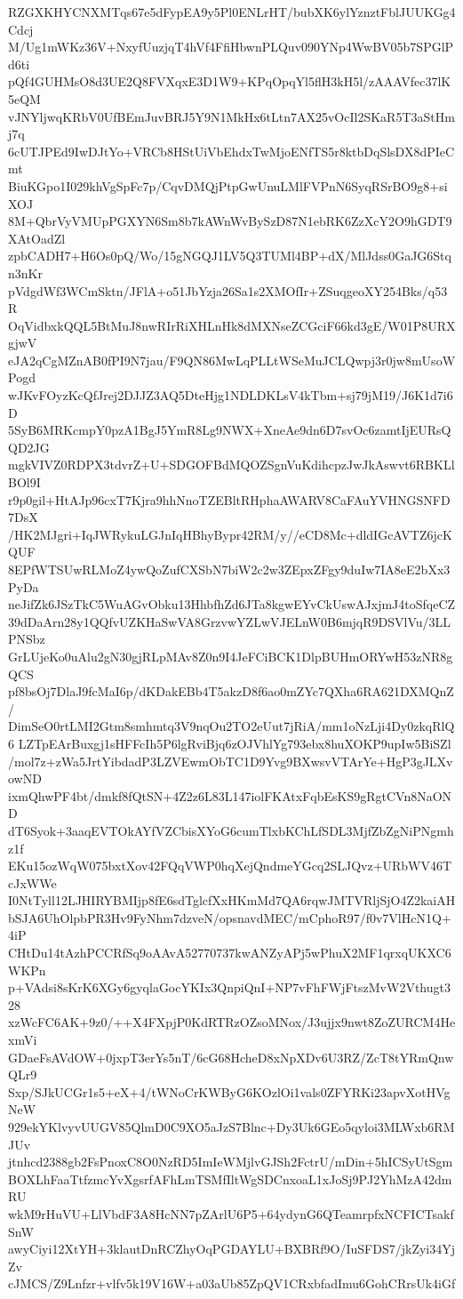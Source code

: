RZGXKHYCNXMTqs67e5dFypEA9y5Pl0ENLrHT/bubXK6ylYznztFblJUUKGg4Cdcj
M/Ug1mWKz36V+NxyfUuzjqT4hVf4FfiHbwnPLQuv090YNp4WwBV05b7SPGlPd6ti
pQf4GUHMsO8d3UE2Q8FVXqxE3D1W9+KPqOpqYl5flH3kH5l/zAAAVfec37lK5eQM
vJNYljwqKRbV0UfBEmJuvBRJ5Y9N1MkHx6tLtn7AX25vOcIl2SKaR5T3aStHmj7q
6cUTJPEd9IwDJtYo+VRCb8HStUiVbEhdxTwMjoENfTS5r8ktbDqSlsDX8dPIeCmt
BiuKGpo1I029khVgSpFc7p/CqvDMQjPtpGwUnuLMlFVPnN6SyqRSrBO9g8+siXOJ
8M+QbrVyVMUpPGXYN6Sm8b7kAWnWvBySzD87N1ebRK6ZzXcY2O9hGDT9XAtOadZl
zpbCADH7+H6Os0pQ/Wo/15gNGQJ1LV5Q3TUMl4BP+dX/MlJdss0GaJG6Stqn3nKr
pVdgdWf3WCmSktn/JFlA+o51JbYzja26Sa1s2XMOfIr+ZSuqgeoXY254Bks/q53R
OqVidbxkQQL5BtMuJ8nwRIrRiXHLnHk8dMXNseZCGciF66kd3gE/W01P8URXgjwV
eJA2qCgMZnAB0fPI9N7jau/F9QN86MwLqPLLtWSeMuJCLQwpj3r0jw8mUsoWPogd
wJKvFOyzKcQfJrej2DJJZ3AQ5DteHjg1NDLDKLsV4kTbm+sj79jM19/J6K1d7i6D
5SyB6MRKcmpY0pzA1BgJ5YmR8Lg9NWX+XneAe9dn6D7svOc6zamtIjEURsQQD2JG
mgkVIVZ0RDPX3tdvrZ+U+SDGOFBdMQOZSgnVuKdihcpzJwJkAswvt6RBKLlBOl9I
r9p0gil+HtAJp96cxT7Kjra9hhNnoTZEBltRHphaAWARV8CaFAuYVHNGSNFD7DsX
/HK2MJgri+IqJWRykuLGJnIqHBhyBypr42RM/y//eCD8Mc+dldIGcAVTZ6jcKQUF
8EPfWTSUwRLMoZ4ywQoZufCXSbN7biW2c2w3ZEpxZFgy9duIw7IA8eE2bXx3PyDa
neJifZk6JSzTkC5WuAGvObku13HhbfhZd6JTa8kgwEYvCkUswAJxjmJ4toSfqeCZ
39dDaArn28y1QQfvUZKHaSwVA8GrzvwYZLwVJELnW0B6mjqR9DSVlVu/3LLPNSbz
GrLUjeKo0uAlu2gN30gjRLpMAv8Z0n9I4JeFCiBCK1DlpBUHmORYwH53zNR8gQCS
pf8bsOj7DlaJ9fcMaI6p/dKDakEBb4T5akzD8f6ao0mZYc7QXha6RA621DXMQnZ/
DimSeO0rtLMI2Gtm8smhmtq3V9nqOu2TO2eUut7jRiA/mm1oNzLji4Dy0zkqRlQ6
LZTpEArBuxgj1sHFFcIh5P6lgRviBjq6zOJVhlYg793ebx8huXOKP9upIw5BiSZl
/mol7z+zWa5JrtYibdadP3LZVEwmObTC1D9Yvg9BXwsvVTArYe+HgP3gJLXvowND
ixmQhwPF4bt/dmkf8fQtSN+4Z2z6L83L147iolFKAtxFqbEsKS9gRgtCVn8NaOND
dT6Syok+3aaqEVTOkAYfVZCbisXYoG6cumTlxbKChLfSDL3MjfZbZgNiPNgmhz1f
EKu15ozWqW075bxtXov42FQqVWP0hqXejQndmeYGcq2SLJQvz+URbWV46TcJxWWe
I0NtTyll12LJHIRYBMIjp8fE6sdTglcfXxHKmMd7QA6rqwJMTVRljSjO4Z2kaiAH
bSJA6UhOlpbPR3Hv9FyNhm7dzveN/opsnavdMEC/mCphoR97/f0v7VlHcN1Q+4iP
CHtDu14tAzhPCCRfSq9oAAvA52770737kwANZyAPj5wPhuX2MF1qrxqUKXC6WKPn
p+VAdsi8sKrK6XGy6gyqlaGocYKIx3QnpiQnI+NP7vFhFWjFtszMvW2Vthugt328
xzWcFC6AK+9z0/++X4FXpjP0KdRTRzOZsoMNox/J3ujjx9nwt8ZoZURCM4HexmVi
GDaeFsAVdOW+0jxpT3erYs5nT/6cG68HcheD8xNpXDv6U3RZ/ZcT8tYRmQnwQLr9
Sxp/SJkUCGr1s5+eX+4/tWNoCrKWByG6KOzlOi1vals0ZFYRKi23apvXotHVgNeW
929ekYKlvyvUUGV85QlmD0C9XO5aJzS7Blnc+Dy3Uk6GEo5qyloi3MLWxb6RMJUv
jtnhcd2388gb2FsPnoxC8O0NzRD5ImIeWMjlvGJSh2FctrU/mDin+5hICSyUtSgm
BOXLhFaaTtfzmcYvXgsrfAFhLmTSMfIltWgSDCnxoaL1xJoSj9PJ2YhMzA42dmRU
wkM9rHuVU+LlVbdF3A8HcNN7pZArlU6P5+64ydynG6QTeamrpfxNCFICTsakfSnW
awyCiyi12XtYH+3klautDnRCZhyOqPGDAYLU+BXBRf9O/IuSFDS7/jkZyi34YjZv
cJMCS/Z9Lnfzr+vlfv5k19V16W+a03aUb85ZpQV1CRxbfadImu6GohCRrsUk4iGf
